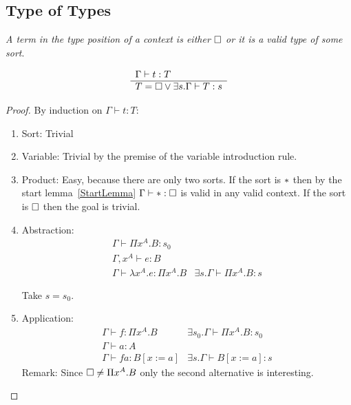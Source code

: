 \subsection{Type of Types}
\label{SecTypeOfTypes}


\begin{theorem}
    \label{TypeOfTypes}
    \emph{A term in the type position of a context is either $\Box$ or it is a
    valid type of some sort}.

    $$
    \begin{array}{l} 
        \Gamma \vdash t : T
     \\ \hline 
        T = \Box \lor \exists s. \Gamma \vdash T : s
    \end{array}
    $$

    \begin{proof}
        By induction on $\Gamma \vdash t : T$:
        \begin{enumerate}
        \item Sort: Trivial

        \item Variable: Trivial by the premise of the variable introduction
            rule.

        \item Product: Easy, because there are only two sorts. If the sort is
            $*$ then by the start lemma~\ref{StartLemma} $\Gamma\vdash
                *: \Box$ is valid in any valid context. If the sort is
                $\Box$ then the goal is trivial.

        \item Abstraction:
            $$
            \begin{array}{l|l}
                \Gamma \vdash \Pi x^A. B : s_0
                \\
                \Gamma,x^A \vdash e: B
                \\
                \hline
                \Gamma \vdash \lambda x^A. e: \Pi x^A. B
                &
                \exists s. \Gamma \vdash \Pi x^A. B : s
            \end{array}
            $$

            Take $s = s_0$.

        \item Application:
            $$
            \begin{array}{l|l}
                \Gamma \vdash f: \Pi x^A. B
                & \exists s_0. \Gamma \vdash \Pi x^A. B: s_0
                \\
                \Gamma \vdash a: A
                \\
                \hline
                \Gamma \vdash f a: B[x:=a]
                &
                \exists s. \Gamma \vdash B[x:=a]: s
            \end{array}
            $$
            Remark: Since $\Box \ne \Pi x^A. B$ only the second alternative is
                interesting.


\end{enumerate}
\end{proof}
\end{theorem}
